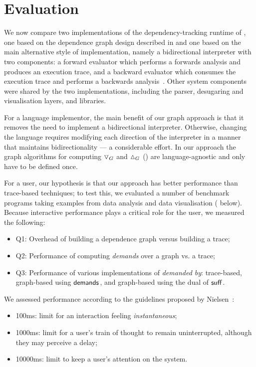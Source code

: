 \section{Evaluation}
\label{sec:evaluation}

We now compare two implementations of the dependency-tracking runtime of \OurLang, one based on the dependence
graph design described in  and one based on the main alternative style of
implementation, namely a bidirectional interpreter with two components: a forward evaluator which performs a
forwards analysis and produces an execution trace, and a backward evaluator which consumes the execution trace
and performs a backwards analysis~\cite{ricciotti17,psallidas18b,perera22}. Other \OurLang system components
were shared by the two implementations, including the parser, desugaring and visualisation layers, and
libraries.

For a language implementor, the main benefit of our graph approach is that it removes the need to implement a
bidirectional interpreter. Otherwise, changing the language requires modifying each direction of the
interpreter in a manner that maintains bidirectionality --- a considerable effort. In our approach the graph
algorithms for computing $\triangledown_{G}$ and $\demandedByR_{G}$ () are
language-agnostic and only have to be defined once.

For a user, our hypothesis is that our approach has better performance than trace-based techniques; to test
this, we evaluated a number of benchmark programs taking examples from data analysis and data visualisation
( below). Because interactive performance plays a critical role for the
user, we measured the following:

\begin{itemize}
   \item Q1: Overhead of building a dependence graph versus building a trace;
   \item Q2: Performance of computing \textit{demands} over a graph vs. a trace;
   \item Q3: Performance of various implementations of \textit{demanded by}: trace-based, graph-based using
   $\mathrel{\textup{\textsf{demands}}_{}}$, and graph-based using the dual of $\mathrel{\textup{\textsf{suff}}_{}}$.
\end{itemize}

\noindent We assessed performance according to the guidelines proposed by Nielsen~\cite{nielsen93}:
\begin{itemize}
   \item 100ms: limit for an interaction feeling \emph{instantaneous};
   \item 1000ms: limit for a user's train of thought to remain uninterrupted, although
   they may perceive a delay;
   \item 10000ms: limit to keep a user's attention on the system.
\end{itemize}

